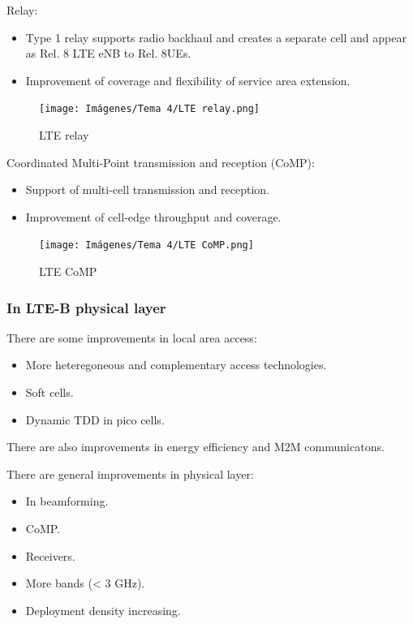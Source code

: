 \documentclass[
	12pt,
	twoside
]{book}
\begin{document}
Relay:
\begin{itemize}
	\item Type 1 relay supports radio backhaul and creates a separate cell and appear as Rel. 8 LTE eNB to Rel. 8UEs.
	\item Improvement of coverage and flexibility of service area extension.
\end{itemize}

\begin{figure}[H]
	\centering
	\texttt{[image: Imágenes/Tema 4/LTE relay.png]}
	\caption{
		\label{fig:unit4_LTE_relay}
		LTE relay
	}
\end{figure}

Coordinated Multi-Point transmission and reception (CoMP):
\begin{itemize}
	\item Support of multi-cell transmission and reception.
	\item Improvement of cell-edge throughput and coverage.
\end{itemize}

\begin{figure}[H]
	\centering
	\texttt{[image: Imágenes/Tema 4/LTE CoMP.png]}
	\caption{
		\label{fig:unit4_LTE_CoMP}
		LTE CoMP
	}
\end{figure}

\subsubsection{In LTE-B physical layer}

There are some improvements in local area access:
\begin{itemize}
	\item More heteregoneous and complementary access technologies.
	\item Soft cells.
	\item Dynamic TDD in pico cells.
\end{itemize}

There are also improvements in energy efficiency and M2M communicatons.

There are general improvements in physical layer:
\begin{itemize}
	\item In beamforming.
	\item CoMP.
	\item Receivers.
	\item More bands (< 3 GHz).
	\item Deployment density increasing.
\end{itemize}
\end{document}
